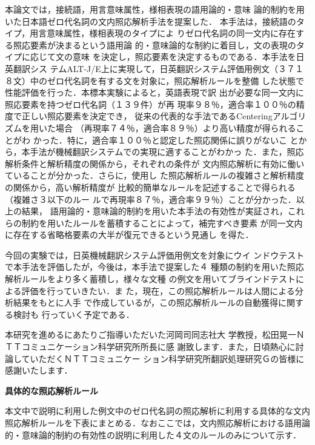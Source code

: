 本論文では，接続語，用言意味属性，様相表現の語用論的・意味
論的制約を用いた日本語ゼロ代名詞の文内照応解析手法を提案した．
本手法は，接続語のタイプ，用言意味属性，様相表現のタイプによ
りゼロ代名詞の同一文内に存在する照応要素が決まるという語用論
的・意味論的な制約に着目し，文の表現のタイプに応じて文の意味
を決定し，照応要素を決定するものである．本手法を日英翻訳シス
テムALT-J/E上に実現して，日英翻訳システム評価用例文（３７１
８文）中のゼロ代名詞を有する文を対象に，照応解析ルールを整備
した状態で性能評価を行った．本標本実験によると，英語表現で訳
出が必要な同一文内に照応要素を持つゼロ代名詞（１３９件）が再
現率９８％，適合率１００％の精度で正しい照応要素を決定でき，
従来の代表的な手法であるCenteringアルゴリズムを用いた場合
（再現率７４％，適合率８９％）より高い精度が得られることがわ
かった．特に，適合率１００％と認定した照応関係に誤りがないこ
とから，本手法が機械翻訳システムでの実現に適することがわかっ
た．また，照応解析条件と解析精度の関係から，それぞれの条件が
文内照応解析に有効に働いていることが分かった．さらに，使用し
た照応解析ルールの複雑さと解析精度の関係から，高い解析精度が
比較的簡単なルールを記述することで得られる（複雑さ３以下のルー
ルで再現率８７％，適合率９９％）ことが分かった．以上の結果，
語用論的・意味論的制約を用いた本手法の有効性が実証され，これ
らの制約を用いたルールを蓄積することによって，補完すべき要素
が同一文内に存在する省略格要素の大半が復元できるという見通し
を得た．

今回の実験では，日英機械翻訳システム評価用例文を対象にウイ
ンドウテストで本手法を評価したが，今後は，本手法で提案した４
種類の制約を用いた照応解析ルールをより多く蓄積し，様々な文種
の例文を用いてブラインドテストによる評価を行っていきたい．ま
た，現在，この照応解析ルールは人間による分析結果をもとに人手
で作成しているが，この照応解析ルールの自動獲得に関する検討も
行っていく予定である．
 

\acknowledgment

本研究を進めるにあたりご指導いただいた河岡司同志社大
学教授，松田晃一ＮＴＴコミュニケーション科学研究所所長に感
謝致します．また，日頃熱心に討論していただくＮＴＴコミュニケー
ション科学研究所翻訳処理研究Ｇの皆様に感謝いたします．





\newpage
\appendix
\noindent
{\bf 具体的な照応解析ルール}

本文中で説明に利用した例文中のゼロ代名詞の照応解析に利用する具体的な文内
照応解析ルールを下表にまとめる．なおここでは，文内照応解析における語用論
的・意味論的制約の有効性の説明に利用した４文のルールのみについて示す．

